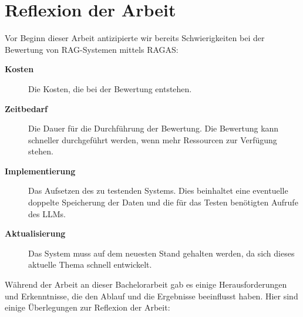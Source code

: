 \section{Reflexion der Arbeit}

Vor Beginn dieser Arbeit antizipierte wir bereits Schwierigkeiten bei der Bewertung von RAG-Systemen mittels RAGAS:
\begin{description}
    \item [\textbf{Kosten}] Die Kosten, die bei der Bewertung entstehen. %
    \item [\textbf{Zeitbedarf}] Die Dauer für die Durchführung der Bewertung. Die Bewertung kann schneller durchgeführt werden, wenn mehr Ressourcen zur Verfügung stehen.
    \item [\textbf{Implementierung}] Das Aufsetzen des zu testenden Systems. Dies beinhaltet eine eventuelle doppelte Speicherung der Daten und die für das Testen benötigten Aufrufe des LLMs. %
    \item [\textbf{Aktualisierung}] Das System muss auf dem neuesten Stand gehalten werden, da sich dieses aktuelle Thema schnell entwickelt.
\end{description}


Während der Arbeit an dieser Bachelorarbeit gab es einige Herausforderungen und Erkenntnisse, die den Ablauf und die Ergebnisse beeinflusst haben. Hier sind einige Überlegungen zur Reflexion der Arbeit:

